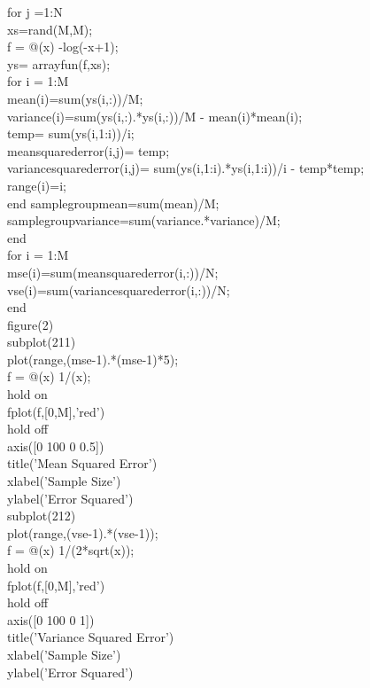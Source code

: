 \documentclass[twoside,twocolumn]{article}
\begin{document}
\begin{itshape}
for j =1:N\\
xs=rand(M,M);\\
f = @(x) -log(-x+1);\\
ys= arrayfun(f,xs);\\
for i = 1:M\\
    mean(i)=sum(ys(i,:))/M;\\
    variance(i)=sum(ys(i,:).*ys(i,:))/M - mean(i)*mean(i);\\
    temp= sum(ys(i,1:i))/i;\\
    meansquarederror(i,j)= temp;\\
    variancesquarederror(i,j)= sum(ys(i,1:i).*ys(i,1:i))/i - temp*temp;\\
    range(i)=i;\\
end
samplegroupmean=sum(mean)/M;\\
samplegroupvariance=sum(variance.*variance)/M;\\
end\\
for i = 1:M\\
   mse(i)=sum(meansquarederror(i,:))/N; \\
   vse(i)=sum(variancesquarederror(i,:))/N;\\
end\\
figure(2)\\
subplot(211)\\
plot(range,(mse-1).*(mse-1)*5);\\
f = @(x) 1/(x);\\
hold on\\
fplot(f,[0,M],'red')\\
hold off\\
axis([0 100 0 0.5])\\
title('Mean Squared Error')\\
xlabel('Sample Size')\\
ylabel('Error Squared')\\
subplot(212)\\
plot(range,(vse-1).*(vse-1));\\
f = @(x) 1/(2*sqrt(x));\\
hold on\\
fplot(f,[0,M],'red')\\
hold off\\
axis([0 100 0 1])\\
title('Variance Squared Error')\\
xlabel('Sample Size')\\
ylabel('Error Squared')\\
\end{itshape}
\end{document}
